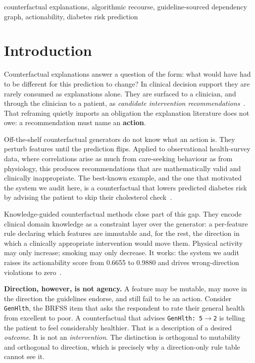 \documentclass[conference]{IEEEtran}
\begin{document}
\begin{IEEEkeywords}
counterfactual explanations, algorithmic recourse, guideline-sourced dependency graph, actionability, diabetes risk prediction
\end{IEEEkeywords}

\section{Introduction}
Counterfactual explanations answer a question of the form: what would have had to be different for this prediction to change? In clinical decision support they are rarely consumed as explanations alone. They are surfaced to a clinician, and through the clinician to a patient, as \emph{candidate intervention recommendations}~\cite{thieu2026}. That reframing quietly imports an obligation the explanation literature does not owe: a recommendation must name an \textbf{action}.

Off-the-shelf counterfactual generators do not know what an action is. They perturb features until the prediction flips. Applied to observational health-survey data, where correlations arise as much from care-seeking behaviour as from physiology, this produces recommendations that are mathematically valid and clinically inappropriate. The best-known example, and the one that motivated the system we audit here, is a counterfactual that lowers predicted diabetes risk by advising the patient to skip their cholesterol check~\cite{thieu2026}.

Knowledge-guided counterfactual methods close part of this gap. They encode clinical domain knowledge as a constraint layer over the generator: a per-feature rule declaring which features are immutable and, for the rest, the direction in which a clinically appropriate intervention would move them. Physical activity may only increase; smoking may only decrease. It works: the system we audit raises its actionability score from 0.6655 to 0.9880 and drives wrong-direction violations to zero~\cite{thieu2026}.

\textbf{Direction, however, is not agency.} A feature may be mutable, may move in the direction the guidelines endorse, and still fail to be an action. Consider \texttt{GenHlth}, the BRFSS item that asks the respondent to rate their general health from excellent to poor. A counterfactual that advises \texttt{GenHlth: 5}$\rightarrow$\texttt{2} is telling the patient to feel considerably healthier. That is a description of a desired \emph{outcome}. It is not an \emph{intervention}. The distinction is orthogonal to mutability and orthogonal to direction, which is precisely why a direction-only rule table cannot see it.
\end{document}
